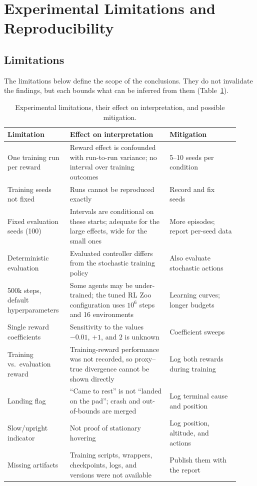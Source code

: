 \documentclass[11pt,a4paper]{article}
\begin{document}
\section{Experimental Limitations and Reproducibility}\label{sec:limits}

\subsection{Limitations}

The limitations below define the scope of the conclusions. They do not invalidate the findings, but each bounds what can be inferred from them (Table~\ref{tab:limits}).

\begin{table}[!htb]
\caption[Limitations and mitigation]{Experimental limitations, their effect on interpretation, and possible mitigation.}\label{tab:limits}
\centering\footnotesize
\begin{tabular}{@{}p{0.24\linewidth}p{0.4\linewidth}p{0.28\linewidth}@{}}
\toprule
Limitation & Effect on interpretation & Mitigation \\
\midrule
One training run per reward & Reward effect is confounded with run-to-run variance; no interval over training outcomes & 5--10 seeds per condition \cite{agarwal2021} \\
Training seeds not fixed & Runs cannot be reproduced exactly & Record and fix seeds \\
Fixed evaluation seeds (100) & Intervals are conditional on these starts; adequate for the large effects, wide for the small ones & More episodes; report per-seed data \\
Deterministic evaluation & Evaluated controller differs from the stochastic training policy & Also evaluate stochastic actions \\
500k steps, default hyperparameters & Some agents may be under-trained; the tuned RL Zoo configuration uses $10^6$ steps and 16 environments \cite{rlzoo} & Learning curves; longer budgets \\
Single reward coefficients & Sensitivity to the values $-0.01$, $+1$, and $2$ is unknown & Coefficient sweeps \\
Training vs.\ evaluation reward & Training-reward performance was not recorded, so proxy--true divergence cannot be shown directly & Log both rewards during training \\
Landing flag & ``Came to rest'' is not ``landed on the pad''; crash and out-of-bounds are merged & Log terminal cause and position \\
Slow/upright indicator & Not proof of stationary hovering & Log position, altitude, and actions \\
Missing artifacts & Training scripts, wrappers, checkpoints, logs, and versions were not available & Publish them with the report \\
\bottomrule
\end{tabular}
\end{table}
\end{document}
